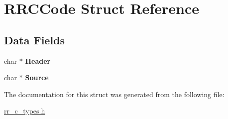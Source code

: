 \hypertarget{struct_r_r_c_code}{
\section{\-R\-R\-C\-Code \-Struct \-Reference}
\label{struct_r_r_c_code}
}
\subsection*{\-Data \-Fields}
\begin{DoxyCompactItemize}
\item 
\hypertarget{struct_r_r_c_code_a129503fa396e877e8400bb7cdc9774b5}{
char $\ast$ {\bfseries \-Header}}
\label{struct_r_r_c_code_a129503fa396e877e8400bb7cdc9774b5}

\item 
\hypertarget{struct_r_r_c_code_a23fa2e731d8e1576c9095868b9651305}{
char $\ast$ {\bfseries \-Source}}
\label{struct_r_r_c_code_a23fa2e731d8e1576c9095868b9651305}

\end{DoxyCompactItemize}


\-The documentation for this struct was generated from the following file\-:\begin{DoxyCompactItemize}
\item 
\hyperlink{rr__c__types_8h}{rr\-\_\-c\-\_\-types.\-h}\end{DoxyCompactItemize}
